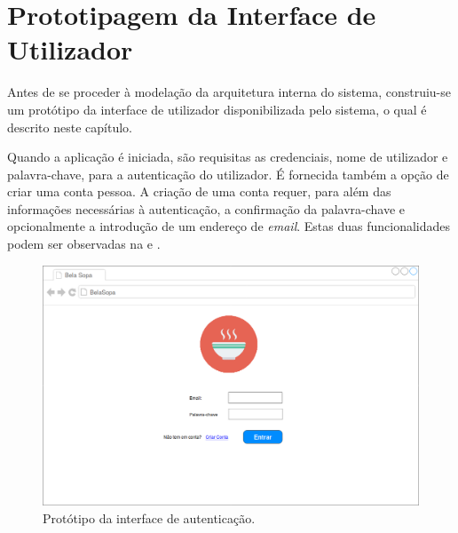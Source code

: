 
\section{Prototipagem da Interface de Utilizador}
\label{cap:interface}

Antes de se proceder à modelação da arquitetura interna do sistema, construiu-se um protótipo da interface de utilizador disponibilizada pelo sistema, o qual é descrito neste capítulo.


Quando a aplicação é iniciada, são requisitas as credenciais, nome de utilizador e palavra-chave, para a autenticação do utilizador. É fornecida também a opção de criar uma conta pessoa. A criação de uma conta requer, para além das informações necessárias à autenticação, a confirmação da palavra-chave e opcionalmente a introdução de um endereço de \emph{email}. Estas duas funcionalidades podem ser observadas na  e .

\begin{figure}[H]
  \centering 
  \includegraphics[width = \textwidth]{figures/07/Login.png}
  \caption{Protótipo da interface de autenticação.}
  \label{fig:interface:login}
\end{figure}

